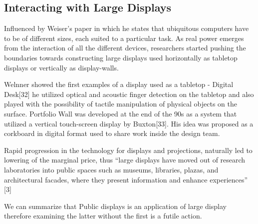 \subsection{Interacting with Large Displays}
Influenced by Weiser's paper \cite{Weiser:1991} in which he states that ubiquitous computers have to be of different sizes, each suited to a particular task. 
As real power emerges from the interaction of all the different devices, researchers started pushing the boundaries towards constructing large displays used horizontally as tabletop displays or vertically as display-walls.
 
Welnner showed the first examples of a display used as a tabletop -  Digital Desk[32] he utilized optical and acoustic finger detection on the tabletop and also played with the possibility of tactile manipulation of physical objects on the surface. Portfolio Wall was developed at the end of the 90s as a system that utilized a vertical touch-screen display by Buxton[33]. His idea was proposed as a corkboard in digital format used to share work inside the design team.

Rapid progression in the technology for displays and projections, naturally led to lowering of the marginal price, thus ``large displays have moved out of research laboratories into public spaces such as museums, libraries, plazas, and architectural facades, where they present information and enhance experiences'' [3]

We can summarize that Public displays is an application of large display therefore examining the latter without the first is a futile action.